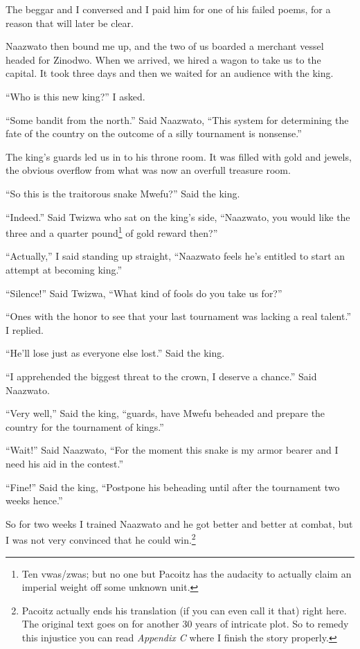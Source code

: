 The beggar and I conversed and I paid him for one of his failed poems, for a reason that will later be clear.

Naazwato then bound me up, and the two of us boarded a merchant vessel headed for Zinodwo.
When we arrived, we hired a wagon to take us to the capital. It took three days and then we waited for an audience with the king.

``Who is this new king?'' I asked.

``Some bandit from the north.'' Said Naazwato, ``This system for determining the fate of the country on the outcome of a silly tournament is nonsense.''

The king's guards led us in to his throne room. It was filled with gold and jewels, the obvious overflow from what was now an overfull treasure room.

``So this is the traitorous snake Mwefu?'' Said the king.

``Indeed.'' Said Twizwa who sat on the king's side, ``Naazwato, you would like the three and a quarter pound\footnote{Ten vwas/zwas; but no one but Pacoitz has the audacity to actually claim an imperial weight off some unknown unit.} of gold reward then?''

``Actually,'' I said standing up straight, ``Naazwato feels he's entitled to start an attempt at becoming king.''

``Silence!'' Said Twizwa, ``What kind of fools do you take us for?''

``Ones with the honor to see that your last tournament was lacking a real talent.'' I replied.

``He'll lose just as everyone else lost.'' Said the king.

``I apprehended the biggest threat to the crown, I deserve a chance.'' Said Naazwato.

``Very well,'' Said the king, ``guards, have Mwefu beheaded and prepare the country for the tournament of kings.''

``Wait!'' Said Naazwato, ``For the moment this snake is my armor bearer and I need his aid in the contest.''

``Fine!'' Said the king, ``Postpone his beheading until after the tournament two weeks hence.''

So for two weeks I trained Naazwato and he got better and better at combat, but I was not very convinced that he could win.\footnote{Pacoitz actually ends his translation (if you can even call it that) right here. The original text goes on for another 30 years of intricate plot. So to remedy this injustice you can read \emph{Appendix C} where I finish the story properly.}
